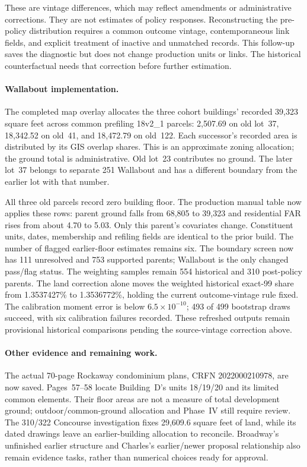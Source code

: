 These are vintage differences, which may reflect amendments or administrative
corrections. They are not estimates of policy responses. Reconstructing the
pre-policy distribution requires a common outcome vintage, contemporaneous
link fields, and explicit treatment of inactive and unmatched records. This
follow-up saves the diagnostic but does not change production units or links.
The historical counterfactual needs that correction before further estimation.

\paragraph{Wallabout implementation.}
The completed map overlay allocates the three cohort buildings' recorded
39,323 square feet across common prefiling 18v2\_1 parcels: 2,507.69 on old
lot~37, 18,342.52 on old~41, and 18,472.79 on old~122. Each successor's
recorded area is distributed by its GIS overlap shares. This is an approximate
zoning allocation; the ground total is administrative. Old lot~23 contributes
no ground. The later lot~37 belongs to separate 251 Wallabout and has a
different boundary from the earlier lot with that number.

All three old parcels record zero building floor. The production manual table
now applies these rows: parent ground falls from 68,805 to 39,323 and
residential FAR rises from about 4.70 to 5.03. Only this parent's covariates
change. Constituent units, dates, membership and refiling fields are identical
to the prior build. The number of flagged earlier-floor estimates remains six.
The boundary screen now has 111 unresolved and 753 supported parents;
Wallabout is the only changed pass/flag status. The weighting samples remain
554 historical and 310 post-policy parents. The land correction alone moves
the weighted historical exact-99 share from 1.3537427\% to 1.3536772\%, holding
the current outcome-vintage rule fixed. The calibration moment error is below
$6.5\times10^{-10}$; 493 of 499 bootstrap draws succeed, with six calibration
failures recorded. These refreshed outputs remain provisional historical
comparisons pending the source-vintage correction above.

\paragraph{Other evidence and remaining work.}
The actual 70-page Rockaway condominium plans, CRFN 2022000210978, are now
saved. Pages~57--58 locate Building~D's units 18/19/20 and its limited common
elements. Their floor areas are not a measure of total development ground;
outdoor/common-ground allocation and Phase~IV still require review. The
310/322 Concourse investigation fixes 29,609.6 square feet of land, while its
dated drawings leave an earlier-building allocation to reconcile. Broadway's
unfinished earlier structure and Charles's earlier/newer proposal relationship
also remain evidence tasks, rather than numerical choices ready for approval.

